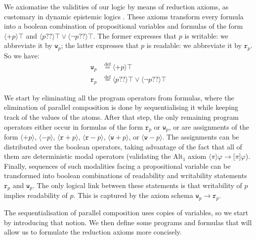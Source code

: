 \documentclass{llncs}
\newcommand{\readable}[1]{\mathtt{r}_{#1}}
\newcommand{\writable}[1]{\mathtt{w}_{#1}}
\newcommand{\testendo}{?\!\!?}			%
\newcommand{\assgntopR}[1]{{\mathtt r {+} #1}}
\newcommand{\assgnbotR}[1]{{\mathtt r {-} #1}}
\newcommand{\assgntopW}[1]{{\mathtt w {+} #1}}
\newcommand{\assgnbotW}[1]{{\mathtt w {-} #1}}
\newcommand{\assgntopV}[1]{{\mathtt {+} #1}}
\newcommand{\assgnbotV}[1]{{\mathtt {-} #1}}
\newcommand{\eqdef}{\stackrel{\text{def}}{=}}
\newcommand{\lbox}[1]{ \big[ #1 \big] }
\newcommand{\ldia}[1]{ \big\langle #1 \big\rangle}
\newcommand{\leqv}{ \leftrightarrow }
\newcommand{\limp}{ \rightarrow }
\renewcommand{\phi}{\varphi}
\begin{document}
We axiomatise the validities of our logic by means of reduction axioms, as customary in dynamic epistemic logics \cite{DitmarschHoekKooi07}. 
These axioms transform every formula into a boolean combination of propositional variables
and formulas of the form
$\ldia{ \assgntopV p } \top $ and 
$\ldia{ p \testendo} \top \lor \ldia{ \lnot p \testendo} \top $. 
The former expresses that $p$ is writable: we abbreviate it by $\writable{p}$;
the latter expresses that $p$ is readable: we abbreviate it by $\readable p$. 
So we have:
\begin{align*}
\writable{p} &\eqdef \ldia{ \assgntopV p } \top 
\\
\readable p &\eqdef \ldia{ p \testendo} \top \lor \ldia{ \lnot p \testendo} \top 
\end{align*}

We start by eliminating all the program operators from formulas, where 
the elimination of parallel composition is done by sequentialising it while keeping track of the values of the atoms. 
After that step, the only remaining program operators 
either occur in formulas of the form $\readable p$ or $\writable p$, 
or are assignments of the form
$\ldia{ \assgntopV p} $,
$\ldia{ \assgnbotV p} $,
$\ldia{ \assgntopR p} $,
$\ldia{ \assgnbotR p} $,
$\ldia{ \assgntopW p} $, or
$\ldia{ \assgnbotW p} $. 
The assignments can be distributed over the boolean operators, taking advantage of the fact that all of them are deterministic modal operators 
(validating the Alt$_1$ axiom $\ldia \pi \phi \limp \lbox \pi \phi$). 
Finally, sequences of such modalities facing a propositional variable can be transformed into 
boolean combinations of readability and writability statements $\readable p$ and $\writable p$.
The only logical link between these statements is that 
writability of $p$ implies readability of $p$. 
This is captured by the axiom schema 
$\writable p \limp \readable p$.

The sequentialisation of parallel composition uses copies of variables, so we start by introducing that notion. 
We then define some programs and formulas 
that will allow us to formulate the reduction axioms more concisely. 
\end{document}
